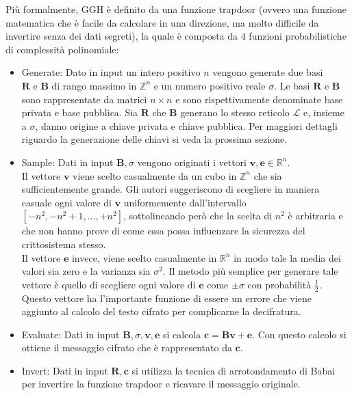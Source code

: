 Più formalmente, GGH è definito da una funzione trapdoor (ovvero una funzione matematica che è facile da 
calcolare in una direzione, ma molto difficile da invertire senza dei dati segreti), la quale
è composta da 4 funzioni probabilistiche di complessità polinomiale:
\begin{itemize}
    \item Generate: Dato in input un intero positivo $n$ vengono generate due basi 
    $\mathbf{R} \text{ e } \mathbf{B}$ di rango massimo in
    $\mathbb{Z}^n$ e un numero positivo reale $\sigma$. Le basi $\mathbf{R} \text{ e } \mathbf{B}$
    sono rappresentate da matrici $n \times n$ e sono rispettivamente denominate base 
    privata e base pubblica. Sia $\mathbf{R}$ che $\mathbf{B}$ generano lo stesso reticolo 
    $\mathcal{L}$ e, insieme a $\sigma$, danno origine a chiave privata e chiave pubblica.
    Per maggiori dettagli riguardo la generazione delle chiavi si veda la prossima sezione.
    \item Sample: Dati in input $\mathbf{B}, \sigma$ vengono originati i vettori
    $\mathbf{v},\mathbf{e} \in \mathbb{R}^n$. \\
    Il vettore $\mathbf{v}$ viene scelto casualmente da un cubo in $\mathbb{Z}^n$ che sia 
    sufficientemente grande. Gli autori suggeriscono di scegliere in maniera casuale
    ogni valore di $\mathbf{v}$ uniformemente dall'intervallo $[-n^2, -n^2 + 1, \dots, +n^2]$, 
    sottolineando però che la scelta di $n^2$ è arbitraria e che non hanno prove
    di come essa possa influenzare la sicurezza del crittosistema stesso. \\
    Il vettore $\mathbf{e}$ invece, viene scelto casualmente in  $\mathbb{R}^n$ in modo
    tale la media dei valori sia zero e la varianza sia $\sigma^2$. Il metodo più semplice
    per generare tale vettore è quello di scegliere ogni valore di $\mathbf{e}$ come $\pm\sigma$
    con probabilità $\frac{1}{2}$. Questo vettore ha l'importante funzione di essere un errore
    che viene aggiunto al calcolo del testo cifrato per complicarne la decifratura. 
    \item Evaluate: Dati in input $\mathbf{B}, \sigma, \mathbf{v}, \mathbf{e}$ si calcola
    $\mathbf{c} = \mathbf{B}\mathbf{v} + \mathbf{e}$. Con questo calcolo si ottiene
    il messaggio cifrato che è rappresentato da $\mathbf{c}$. 
    \item Invert: Dati in input $\mathbf{R},\mathbf{c}$ si utilizza la tecnica di arrotondamento
    di Babai per invertire la funzione trapdoor e ricavare il messaggio originale.
\end{itemize}

%
%

%
%

